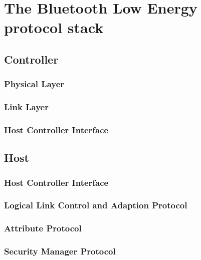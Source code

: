 \documentclass[pdftex,a4paper,12pt,twoside]{report}
\begin{document}
\chapter{The Bluetooth Low Energy protocol stack}
\label{ch:protocolstack}

\section{Controller}
\label{sec:stackController}

\subsection{Physical Layer}
\label{subsec:controllerPHY}

\subsection{Link Layer}
\label{subsec:controllerLL}

\subsection{Host Controller Interface}
\label{subsec:controllerHCI}

\section{Host}
\label{sec:stackHost}

\subsection{Host Controller Interface}
\label{subsec:hostHCI}

\subsection{Logical Link Control and Adaption Protocol}
\label{subsec:hostATTL2CAP}

\subsection{Attribute Protocol}
\label{subsec:hostATT}

\subsection{Security Manager Protocol}
\label{subsec:hostSMP}
\end{document}
